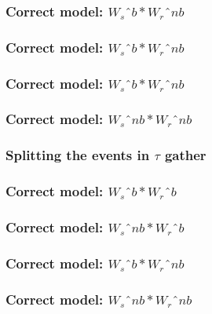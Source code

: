 \begin{frame} \frametitle{Correct model: $W_{s}ˆ{b} * W_{r}ˆ{nb} $}
\end{frame}

\begin{frame} \frametitle{Correct model: $W_{s}ˆ{b} * W_{r}ˆ{nb} $}
\end{frame}

\begin{frame} \frametitle{Correct model: $W_{s}ˆ{b} * W_{r}ˆ{nb} $}
\end{frame}

\begin{frame} \frametitle{Correct model: $W_{s}ˆ{nb} * W_{r}ˆ{nb} $}
\end{frame}







\begin{frame} \frametitle{Splitting the events in $\tau$ gather} \end{frame}

\begin{frame} \frametitle{Correct model: $W_{s}ˆb * W_{r}ˆb $}
\end{frame}

\begin{frame} \frametitle{Correct model: $W_{s}ˆ{nb} * W_{r}ˆ{b} $}
\end{frame}


\begin{frame} \frametitle{Correct model: $W_{s}ˆ{b} * W_{r}ˆ{nb} $}
\end{frame}

\begin{frame} \frametitle{Correct model: $W_{s}ˆ{nb} * W_{r}ˆ{nb} $}
\end{frame}








